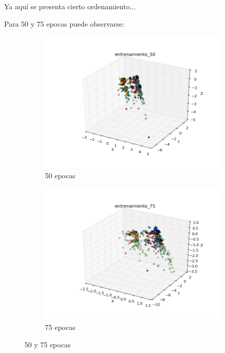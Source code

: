 Ya aquí se presenta cierto ordenamiento...

\pagebreak

Para 50 y 75 epocas puede observarse:

\begin{figure}[h!]
\centering
\begin{subfigure}{.5\textwidth}
  \centering
  \includegraphics[width=.9\linewidth]{convergencia_oja/entrenamiento_50.png}
  \caption{50 epocas}
  \label{fig:sub1}
\end{subfigure}%
\begin{subfigure}{.5\textwidth}
  \centering
  \includegraphics[width=.9\linewidth]{convergencia_oja/entrenamiento_75.png}
  \caption{75 epocas}
  \label{fig:sub2}
\end{subfigure}
\caption{50 y 75 epocas}
\label{fig:test}
\end{figure}


